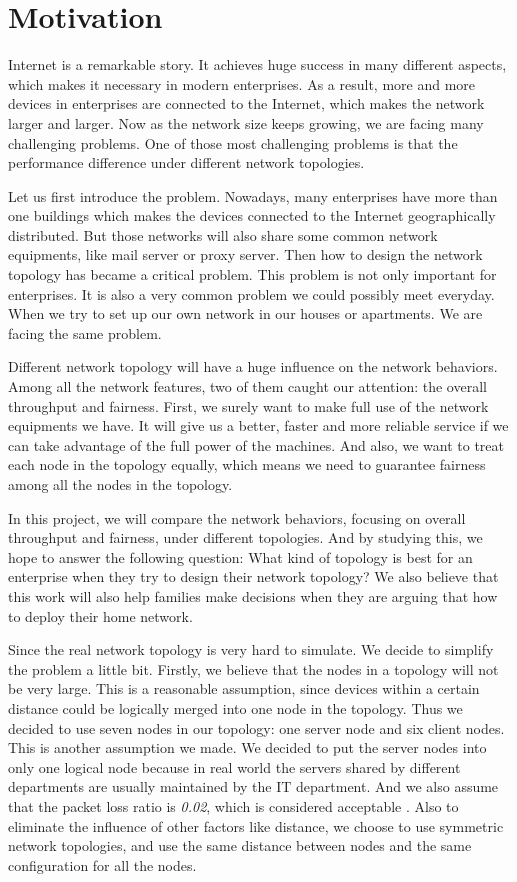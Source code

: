 \section{Motivation} \label{sec:motivation}

Internet is a remarkable story. It achieves huge success in many different aspects, 
which makes it necessary in modern enterprises.
As a result, more and more devices in enterprises are connected to the Internet, 
which makes the network larger and larger. Now as the network size keeps growing, 
we are facing many challenging problems.
One of those most challenging problems is 
that the performance difference under different network topologies.

Let us first introduce the problem.
Nowadays, many enterprises have more than one buildings 
which makes the devices connected to the Internet geographically distributed. 
But those networks will also share some common network equipments, 
like mail server or proxy server. 
Then how to design the network topology has became a critical problem. 
This problem is not only important for enterprises. 
It is also a very common problem we could possibly meet everyday. 
When we try to set up our own network in our houses or apartments. 
We are facing the same problem.

Different network topology will have a huge influence on the network behaviors. 
Among all the network features, two of them caught our attention: 
the overall throughput and fairness. 
First, we surely want to make full use of the network equipments we have. 
It will give us a better, faster and more reliable service 
if we can take advantage of the full power of the machines. 
And also, we want to treat each node in the topology equally, 
which means we need to guarantee fairness among all the nodes in the topology.
 
In this project, we will compare the network behaviors, 
focusing on overall throughput and fairness, under different topologies. 
And by studying this, we hope to answer the following question: 
What kind of topology is best for an enterprise when they try to design their network topology? 
We also believe that this work will also help families make decisions 
when they are arguing that how to deploy their home network.

Since the real network topology is very hard to simulate. 
We decide to simplify the problem a little bit. 
Firstly, we believe that the nodes in a topology will not be very large. 
This is a reasonable assumption, since devices within a certain distance 
could be logically merged into one node in the topology. 
Thus we decided to use seven nodes in our topology: 
one server node and six client nodes. This is another assumption we made. 
We decided to put the server nodes into only one logical node 
because in real world the servers shared by different departments are usually 
maintained by the IT department. And we also assume that 
the packet loss ratio is \textit{0.02}, which is considered acceptable \cite{PacketLoss:wiki}. 
Also to eliminate the influence of other factors like distance, 
we choose to use symmetric network topologies, 
and use the same distance between nodes and the same configuration for all the nodes.
